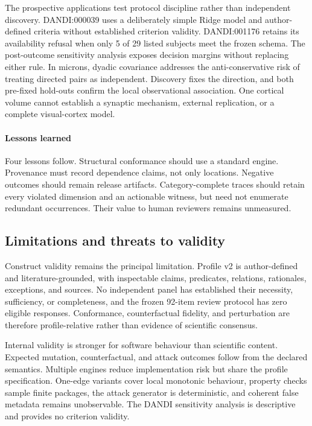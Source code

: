 The prospective applications test protocol discipline rather than independent discovery. DANDI:000039 uses a deliberately simple Ridge model and author-defined criteria without established criterion validity. DANDI:001176 retains its availability refusal when only 5 of 29 listed subjects meet the frozen schema. The post-outcome sensitivity analysis exposes decision margins without replacing either rule. In \ac{microns}, dyadic covariance addresses the anti-conservative risk of treating directed pairs as independent. Discovery fixes the direction, and both pre-fixed hold-outs confirm the local observational association. One cortical volume cannot establish a synaptic mechanism, external replication, or a complete visual-cortex model.

\paragraph{Lessons learned}\label{par:lessons-learned}
Four lessons follow. Structural conformance should use a standard engine. Provenance must record dependence claims, not only locations. Negative outcomes should remain release artifacts. Category-complete traces should retain every violated dimension and an actionable witness, but need not enumerate redundant occurrences. Their value to human reviewers remains unmeasured.

\subsection{Limitations and threats to validity}
\label{subsec:limitations}

Construct validity remains the principal limitation. Profile v2 is author-defined and literature-grounded, with inspectable claims, predicates, relations, rationales, exceptions, and sources. No independent panel has established their necessity, sufficiency, or completeness, and the frozen 92-item review protocol has zero eligible responses. Conformance, counterfactual fidelity, and perturbation are therefore profile-relative rather than evidence of scientific consensus.

Internal validity is stronger for software behaviour than scientific content. Expected mutation, counterfactual, and attack outcomes follow from the declared semantics. Multiple engines reduce implementation risk but share the profile specification. One-edge variants cover local monotonic behaviour, property checks sample finite packages, the attack generator is deterministic, and coherent false metadata remains unobservable. The DANDI sensitivity analysis is descriptive and provides no criterion validity.

